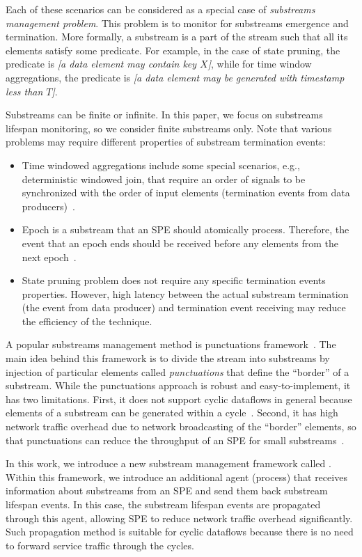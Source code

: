 Each of these scenarios can be considered as a special case of {\em substreams management problem}. This problem is to monitor for substreams emergence and termination. More formally, a substream is a part of the stream such that all its elements satisfy some predicate. For example, in the case of state pruning, the predicate is {\em [a data element may contain key $X$]}, while for time window aggregations, the predicate is {\em [a data element may be generated with timestamp less than $T$]}. 

Substreams can be finite or infinite. In this paper, we focus on substreams lifespan monitoring, so we consider finite substreams only. Note that various problems may require different properties of substream termination events:
\begin{itemize}
    \item Time windowed aggregations include some special scenarios, e.g., deterministic windowed join, that require an order of signals to be synchronized with the order of input elements (termination events from data producers)~\cite{najdataei2019stretch, gulisano2016scalejoin}.
    \item Epoch is a substream that an SPE should atomically process. Therefore, the event that an epoch ends should be received before any elements from the next epoch~\cite{2015arXiv150608603C}. 
    \item State pruning problem does not require any specific termination events properties. However, high latency between the actual substream termination (the event from data producer) and termination event receiving may reduce the efficiency of the technique.
\end{itemize}

A popular substreams management method is punctuations framework~\cite{tucker2003exploiting}. The main idea behind this framework is to divide the stream into substreams by injection of particular elements called {\em punctuations} that define the ``border'' of a substream. While the punctuations approach is robust and easy-to-implement, it has two limitations. First, it does not support cyclic dataflows in general because elements of a substream can be generated within a cycle~\cite{carbone2018scalable}. Second, it has high network traffic overhead due to network broadcasting of the ``border'' elements, so that punctuations can reduce the throughput of an SPE for small substreams~\cite{Li:2008:OPN:1453856.1453890}. 

In this work, we introduce a new substream management framework called \tracker. Within this framework, we introduce an additional agent (process) that receives information about substreams from an SPE and send them back substream lifespan events. In this case, the substream lifespan events are propagated through this agent, allowing SPE to reduce network traffic overhead significantly. Such propagation method is suitable for cyclic dataflows because there is no need to forward service traffic through the cycles.

